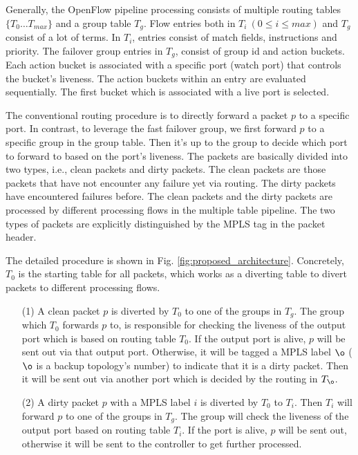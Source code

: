\documentclass[10pt,journal]{IEEEtran}
\begin{document}
Generally, the OpenFlow pipeline processing consists of multiple routing tables  $\{T_0 \ldots T_{max}\}$ and a group table $T_g$.
Flow entries both in $T_i\ (0\leq i\leq max)$ and $T_g$ consist of a lot of terms. In $T_i$, entries consist of match fields, instructions and priority. The failover group entries in $T_g$, consist of group id and action buckets. Each action bucket is associated with a specific port (watch port) that controls the bucket's liveness. The action buckets within an entry are evaluated sequentially. The first bucket which is associated with a live port is selected.

The conventional routing procedure is to directly forward a packet $p$ to a specific port. In contrast, to leverage the fast failover group, we first forward $p$ to a specific group in the group table. Then it's up to the group to decide which port to forward to based on the port's liveness. The packets are basically divided into two types, i.e., clean packets and dirty packets. The clean packets are those packets that have not encounter any failure yet via routing. The dirty packets have encountered failures before. The clean packets and the dirty packets are processed by different processing flows in the multiple table pipeline. The two types of packets are explicitly distinguished by the MPLS tag in the packet header.

The detailed procedure is shown in Fig. \ref{fig:proposed_architecture}. Concretely, $T_0$ is the starting table for all packets, which works as a diverting table to divert packets to different processing flows.
\begin{enumerate}
\item[(1)] A clean packet $p$ is diverted by $T_0$ to one of the groups in $T_g$. The group which $T_0$ forwards $p$ to, is responsible for checking the liveness of the output port which is based on routing table $T_0$. If the output port is alive, $p$ will be sent out via that output port. Otherwise, it will be tagged a MPLS label $\o$ ($\o$ is a backup topology's number) to indicate that it is a dirty packet. Then it will be sent out via another port which is decided by the routing in $T_{\o}$.
\item[(2)] A dirty packet $p$ with a MPLS label $i$ is diverted by $T_0$ to $T_{i}$. Then $T_{i}$ will forward $p$ to one of the groups in $T_g$. The group will check the liveness of the output port based on routing table $T_{i}$. If the port is alive, $p$ will be sent out, otherwise it will be sent to the controller to get further processed.
\end{enumerate}
\end{document}
